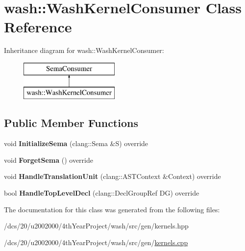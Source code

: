\hypertarget{classwash_1_1WashKernelConsumer}{}\section{wash\+:\+:Wash\+Kernel\+Consumer Class Reference}
\label{classwash_1_1WashKernelConsumer}
Inheritance diagram for wash\+:\+:Wash\+Kernel\+Consumer\+:\begin{figure}[H]
\begin{center}
\leavevmode
\includegraphics[height=2.000000cm]{classwash_1_1WashKernelConsumer}
\end{center}
\end{figure}
\subsection*{Public Member Functions}
\begin{DoxyCompactItemize}
\item 
\mbox{\label{classwash_1_1WashKernelConsumer_a8a3a43dcfdb34cb1891d54e413b707e3}} 
void {\bfseries Initialize\+Sema} (clang\+::\+Sema \&S) override
\item 
\mbox{\label{classwash_1_1WashKernelConsumer_a0531ff5c2b5dcb62315a1394c388dbfd}} 
void {\bfseries Forget\+Sema} () override
\item 
\mbox{\label{classwash_1_1WashKernelConsumer_a1baaebde57e096b696b446583bfb8f3c}} 
void {\bfseries Handle\+Translation\+Unit} (clang\+::\+A\+S\+T\+Context \&Context) override
\item 
\mbox{\label{classwash_1_1WashKernelConsumer_aa62ab9fa6e26322416d3bab549571c05}} 
bool {\bfseries Handle\+Top\+Level\+Decl} (clang\+::\+Decl\+Group\+Ref DG) override
\end{DoxyCompactItemize}


The documentation for this class was generated from the following files\+:\begin{DoxyCompactItemize}
\item 
/dcs/20/u2002000/4th\+Year\+Project/wash/src/gen/kernels.\+hpp\item 
/dcs/20/u2002000/4th\+Year\+Project/wash/src/gen/\mbox{\hyperlink{kernels_8cpp}{kernels.\+cpp}}\end{DoxyCompactItemize}
